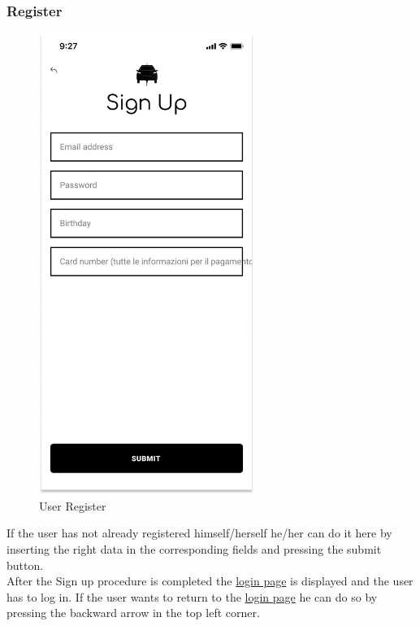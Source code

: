 \subsubsection{Register}
\begin{figure}[H]
    \centering
    \includegraphics[keepaspectratio, height=15cm]{AppInterface/Register.png}
    \caption{User Register}
    \label{fig:Register}
\end{figure}
If the user has not already registered himself/herself he/her can do it here by inserting the right data in the corresponding fields and pressing the submit button.\\
After the Sign up procedure is completed the \hyperref[fig:Login]{login page} is displayed and the user has to log in.
If the user wants to return to the \hyperref[fig:Login]{login page} he can do so by pressing the backward arrow in the top left corner.\\
